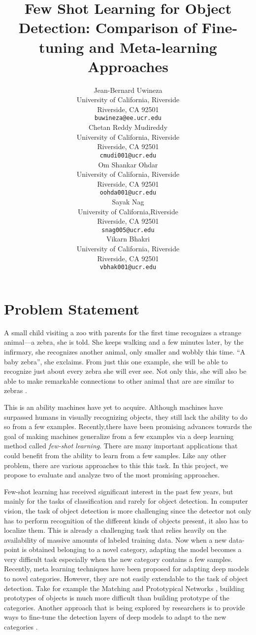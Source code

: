 \documentclass{article}
\title{Few Shot Learning for Object Detection: 
Comparison of Fine-tuning and Meta-learning Approaches}
\author{%
  Jean-Bernard Uwineza 
  \\
  University of California, Riverside\\
  Riverside, CA 92501 \\
  \texttt{buwineza@ee.ucr.edu} \\
  \And
  Chetan Reddy Mudireddy \\
  University of California, Riverside \\
  Riverside, CA 92501 \\
  \texttt{cmudi001@ucr.edu} \\
  \AND
  Om Shankar Ohdar \\
  University of California, Riverside \\
  Riverside, CA 92501 \\
  \texttt{oohda001@ucr.edu} \\
  \And
  Sayak Nag \\
  University of California,Riverside \\
  Riverside, CA 92501 \\
  \texttt{snag005@ucr.edu} \\
  \And
  Vikarn Bhakri \\
  University of California, Riverside \\
  Riverside, CA 92501 \\
  \texttt{vbhak001@ucr.edu} \\
}
\begin{document}
\maketitle


\section{Problem Statement}
A small child visiting a zoo with parents for the first time recognizes a strange animal---a zebra, 
she is told. She keeps walking and a few minutes later, by the infirmary, she recognizes another animal,
only smaller and wobbly this time. ``A baby zebra'', she exclaims. From just this one example, 
she will be able to recognize just about every zebra she will ever see. Not only this, 
she will also be able to make remarkable connections to other animal that are are similar 
to zebras \cite{samuelson2005they}. 

This is an ability machines have yet to acquire. Although machines have surpassed humans in 
visually recognizing objects, they still lack the ability to do so from a few examples. 
Recently,there have been promising advances towards the goal of making machines generalize 
from a few examples via a deep learning method called \textit{few-shot learning}. 
There are many important applications that could benefit from the ability to learn from a few 
samples. Like any other problem, there are various approaches to this this task.
In this project, we propose to evaluate and analyze two of the most promising approaches. 

Few-shot learning has received significant interest in the past few years, 
but mainly for the tasks of classification and rarely for object detection. 
In computer vision, the task of object detection is more challenging since the detector 
not only has to perform recognition of the different kinds of objects present,
it also has to localize them. This is already a challenging task that relies heavily 
on the availability of massive amounts of labeled training data. Now when a new data-point 
is obtained belonging to a novel category, adapting the model becomes a very difficult 
task especially when the new category contains a few samples. Recently, meta learning techniques 
have been proposed for adapting deep models to novel categories. However, they are not easily 
extendable to the task of object detection. Take for example the Matching \cite{VinyalsBLKW16} 
and Prototypical Networks \cite{snell2017prototypical}, building prototypes of objects is 
much more difficult than building prototype of the categories. Another approach that is being 
explored by researchers is to provide ways to fine-tune the detection layers of 
deep models to adapt to the new categories \cite{wang2020frustratingly}.
\end{document}
